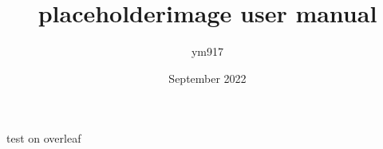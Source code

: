 \documentclass[12pt]{article}
\title{placeholderimage user manual}
\author{ym917}
\date{September 2022}
\begin{document}
    \maketitle
    \placeholder[@][0.4\textwidth]
    \placeholder[@][0.4\textwidth]
    test on overleaf
\end{document}
